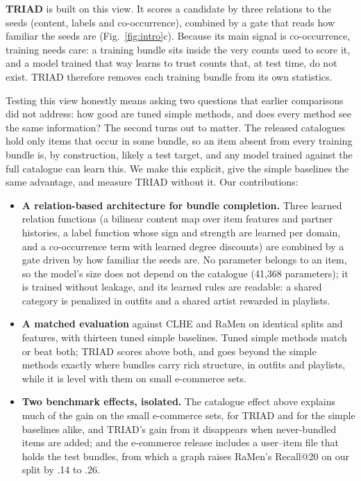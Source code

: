 \documentclass[runningheads]{llncs}
\begin{document}
\textbf{TRIAD} is built on this view. It scores a candidate by three relations to the seeds (content, labels and
co-occurrence), combined by a gate that reads how familiar the seeds are (Fig.~\ref{fig:intro}c). Because
its main signal is co-occurrence, training needs care: a training bundle sits inside the very counts used to score
it, and a model trained that way learns to trust counts that, at test time, do not exist. TRIAD therefore removes each
training bundle from its own statistics.

Testing this view honestly means asking two questions that earlier comparisons did not address: how good are tuned simple methods,
and does every method see the same information? The second turns out to matter. The released catalogues hold only
items that occur in some bundle, so an item absent from every training bundle is, by construction, likely a test
target, and any model trained against the full catalogue can learn this. We make this explicit, give the simple
baselines the same advantage, and measure TRIAD without it. Our contributions:
\begin{itemize}
\item \textbf{A relation-based architecture for bundle completion.} Three learned relation functions (a bilinear
content map over item features and partner histories, a label function whose sign and strength are learned per
domain, and a co-occurrence term with learned degree discounts) are combined by a gate driven by how familiar the seeds
are. No parameter belongs to an item, so the model's size does not depend on the catalogue (41,368 parameters); it is
trained without leakage, and its learned rules are readable: a shared category is penalized in outfits and a shared
artist rewarded in playlists.
\item \textbf{A matched evaluation} against CLHE and RaMen on identical splits and features, with thirteen tuned
simple baselines. Tuned simple methods match or beat both; TRIAD scores above both, and goes beyond the simple methods
exactly where bundles
carry rich structure, in outfits and playlists, while it is level with them on small e-commerce sets.
\item \textbf{Two benchmark effects, isolated.} The catalogue effect above explains much of the gain on the small
e-commerce sets, for TRIAD and for the simple baselines alike, and TRIAD's gain from it disappears when never-bundled
items are added; and the e-commerce release includes a user--item
file that holds the test bundles, from which a graph raises RaMen's Recall@20 on our split by .14 to .26.
\end{itemize}
\end{document}
